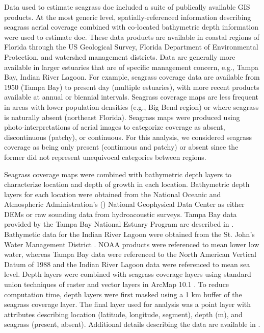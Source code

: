 \documentclass[letterpaper,12pt,oneside]{article}\usepackage[]{graphicx}\usepackage[]{color}
\begin{document}
Data used to estimate seagrass \ac{doc} included a suite of publically available \ac{GIS} products.  At the most generic level, spatially-referenced information describing seagrass aerial coverage combined with co-located bathymetric depth information were used to estimate \ac{doc}.  These data products are available in coastal regions of Florida through the US Geological Survey, Florida Department of Environmental Protection, and watershed management districts.  Data are generally more available in larger estuaries that are of specific management concern, e.g., Tampa Bay, Indian River Lagoon.  For example, seagrass coverage data are available from 1950 (Tampa Bay) to present day (multiple estuaries), with more recent products available at annual or  biennial intervals.  Seagrass coverage maps are less frequent in areas with lower population densities (e.g., Big Bend region) or where seagrass is naturally absent (northeast Florida).  Seagrass maps were produced using photo-interpretations of aerial images to categorize coverage as absent, discontinuous (patchy), or continuous.  For this analysis, we considered seagrass coverage as being only present (continuous and patchy) or absent since the former did not represent unequivocal categories between regions. 

Seagrass coverage maps were combined with bathymetric depth layers to characterize location and depth of growth in each location.  Bathymetric depth layers for each location were obtained from the National Oceanic and Atmospheric Administration's () National Geophysical Data Center as either \acp{DEM} or raw sounding data from hydroacoustic surveys.  Tampa Bay data provided by the Tampa Bay National Estuary Program are described in \citet{Tyler07}. Bathymetic data for the Indian River Lagoon were obtained from the St. John's Water Management District \citep{CPE97}.  \ac{NOAA} products were referenced to mean lower low water, whereas Tampa Bay data were referenced to the North American Vertical Datum of 1988 and the Indian River Lagoon data were referenced to mean sea level.  Depth layers were combined with seagrass coverage layers using standard union techniques of raster and vector layers in ArcMap 10.1 \citep{ESRI12}.  To reduce computation time, depth layers were first masked using a 1 km buffer of the seagrass coverage layer.  The final layer used for analysis was a point layer with attributes describing location (latitude, longitude, segment), depth (m), and seagrass (present, absent).  Additional details describing the data are available in .    
\end{document}
